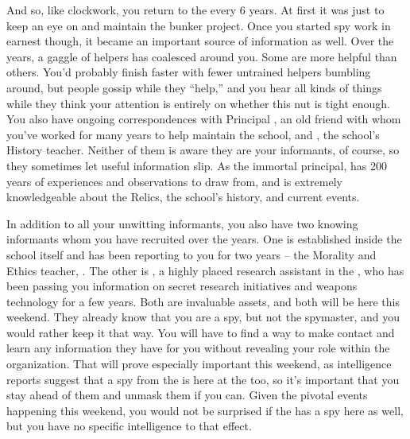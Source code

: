 \documentclass[char]{GL2020}
\begin{document}
And so, like clockwork, you return to the \pSchool{} every 6 years. At first it was just to keep an eye on and maintain the bunker project. Once you started spy work in earnest though, it became an important source of information as well. Over the years, a gaggle of helpers has coalesced around you. Some are more helpful than others. You'd probably finish faster with fewer untrained helpers bumbling around, but people gossip while they ``help,'' and you hear all kinds of things while they think your attention is entirely on whether this nut is tight enough. You also have ongoing correspondences with Principal \cPrincipal{\full}, an old friend with whom you've worked for many years to help maintain the school, and \cHistory{\full}, the school's History teacher. Neither of them is aware they are your informants, of course, so they sometimes let useful information slip. As the immortal principal, \cPrincipal{} has 200 years of experiences and observations to draw from, and \cHistory{} is extremely knowledgeable about the Relics, the school's history, and current events. 

In addition to all your unwitting informants, you also have two knowing informants whom you have recruited over the years. One is established inside the school itself and has been reporting to you for two years – the Morality and Ethics teacher, \cEthics{\full}. The other is \cAssistantScientist{\full}, a highly placed research assistant in the \pTech{}, who has been passing you information on secret research initiatives and weapons technology for a few years. Both are invaluable assets, and both will be here this weekend. They already know that you are a \pShip{} spy, but not the spymaster, and you would rather keep it that way. You will have to find a way to make contact and learn any information they have for you without revealing your role within the organization. That will prove especially important this weekend, as intelligence reports suggest that a spy from the \pFarm{} is here at the \pSc{} too, so it's important that you stay ahead of them and unmask them if you can. Given the pivotal events happening this weekend, you would not be surprised if the \pTech{} has a spy here as well, but you have no specific intelligence to that effect.
\end{document}
